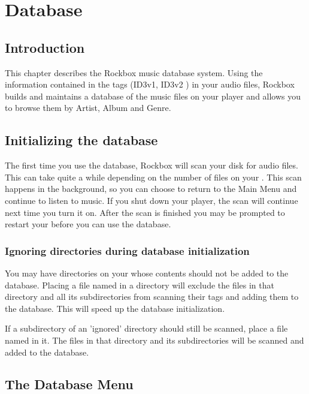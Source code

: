 \section{\label{ref:database}Database}

\subsection{Introduction}
This chapter describes the Rockbox music database system. Using the information
contained in the tags (ID3v1, ID3v2%
) in your audio files, Rockbox builds and maintains a database of the music
files on your player and allows you to browse them by Artist, Album and Genre.

\subsection{Initializing the database}
The first time you use the database, Rockbox will scan your disk for audio files.
This can take quite a while depending on the number of files on your \dap{}.
This scan happens in the background, so you can choose to return to the
Main Menu and continue to listen to music.
If you shut down your player, the scan will continue next time you turn it on.
After the scan is finished you may be prompted to restart your \dap{} before
you can use the database.

\subsubsection{Ignoring directories during database initialization}

You may have directories on your \dap{} whose contents should not be added
to the database. Placing a file named  in a directory
will exclude the files in that directory and all its subdirectories from
scanning their tags and adding them to the database. This will speed up the
database initialization.

If a subdirectory of an 'ignored' directory should still be scanned, place a
file named  in it. The files in that directory and
its subdirectories will be scanned and added to the database.

\subsection{\label{ref:databasemenu}The Database Menu}


